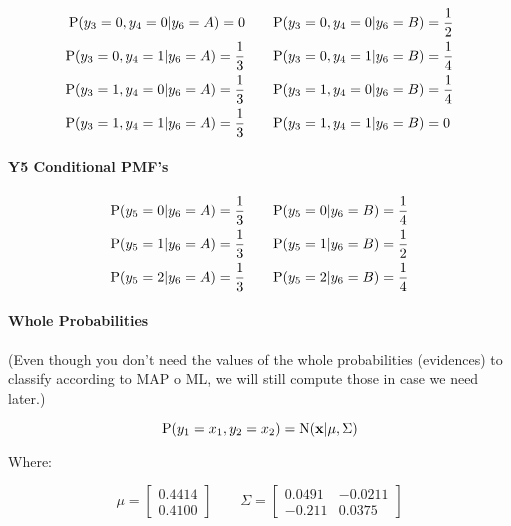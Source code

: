 \documentclass[12pt]{article}
\begin{document}
\begin{enumerate}[leftmargin=\labelsep]
\begin{enumerate}
        \begin{equation}
        \begin{split}
            \textrm{P}(y_3 = 0, y_4 = 0 | y_6 = A) = 0 &\qquad \textrm{P}(y_3 = 0, y_4 = 0 | y_6 = B) = \frac{1}{2} \\
            \textrm{P}(y_3 = 0, y_4 = 1 | y_6 = A) = \frac{1}{3} &\qquad \textrm{P}(y_3 = 0, y_4 = 1 | y_6 = B) = \frac{1}{4} \\
            \textrm{P}(y_3 = 1, y_4 = 0 | y_6 = A) = \frac{1}{3} &\qquad \textrm{P}(y_3 = 1, y_4 = 0 | y_6 = B) = \frac{1}{4} \\
            \textrm{P}(y_3 = 1, y_4 = 1 | y_6 = A) = \frac{1}{3} &\qquad \textrm{P}(y_3 = 1, y_4 = 1 | y_6 = B) = 0
        \end{split}
        \end{equation}

        \paragraph{Y5 Conditional PMF's}

        \begin{equation}
        \begin{split}
            \textrm{P}(y_5 = 0 | y_6 = A) = \frac{1}{3} &\qquad \textrm{P}(y_5 = 0 | y_6 = B) = \frac{1}{4} \\
            \textrm{P}(y_5 = 1 | y_6 = A) = \frac{1}{3} &\qquad \textrm{P}(y_5 = 1 | y_6 = B) = \frac{1}{2} \\
            \textrm{P}(y_5 = 2 | y_6 = A) = \frac{1}{3} &\qquad \textrm{P}(y_5 = 2 | y_6 = B) = \frac{1}{4}
        \end{split}
        \end{equation}

        \paragraph{Whole Probabilities}

        (Even though you don't need the values of the whole probabilities (evidences) to classify according to MAP o ML, we will still compute those in case we need later.)

        \begin{equation}
            \textrm{P}(y_1 = x_1, y_2 = x_2) = \textrm{N}(\mathbf{x} | \mu, \Sigma)
        \end{equation}

        Where:
    
        \begin{equation}
            \mu = \begin{bmatrix}
                0.4414 \\
                0.4100
            \end{bmatrix} \qquad \Sigma = \begin{bmatrix}
                0.0491 & -0.0211 \\
                -0.211 & 0.0375
            \end{bmatrix}
        \end{equation}


\end{enumerate}
\end{enumerate}
\end{document}
